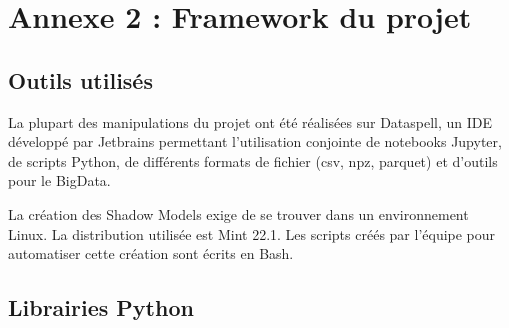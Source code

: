 \chapter*{Annexe 2 : Framework du projet}
\section*{Outils utilisés}

    La plupart des manipulations du projet ont été réalisées sur Dataspell, un IDE développé par
    Jetbrains permettant l'utilisation conjointe de notebooks Jupyter, de scripts Python, de
    différents formats de fichier (csv, npz, parquet) et d'outils pour le BigData.

    La création des Shadow Models exige de se trouver dans un environnement Linux. La
    distribution utilisée est Mint 22.1. Les scripts créés par l'équipe pour automatiser cette
    création sont écrits en Bash.

\section*{Librairies Python}

